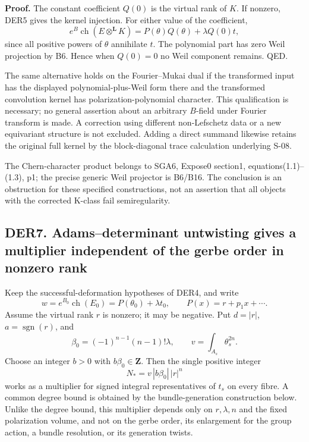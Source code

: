 \documentclass[11pt,a4paper]{article}
\theoremstyle{definition}
\begin{document}
\textbf{Proof.} The constant coefficient \(Q(0)\) is the virtual rank of
\(K\). If nonzero, DER5 gives the kernel injection. For either value of
the coefficient, \[
 e^B\operatorname{ch}(E\otimes^{\mathbf L}K)
 =P(\theta)Q(\theta)+\lambda Q(0)t,
\tag{DER6}
\] since all positive powers of \(\theta\) annihilate \(t\). The
polynomial part has zero Weil projection by B6. Hence when \(Q(0)=0\) no
Weil component remains. QED.

The same alternative holds on the Fourier--Mukai dual if the transformed
input has the displayed polynomial-plus-Weil form there and the
transformed convolution kernel has polarization-polynomial character.
This qualification is necessary; no general assertion about an arbitrary
\(B\)-field under Fourier transform is made. A correction using
different non-Lefschetz data or a new equivariant structure is not
excluded. Adding a direct summand likewise retains the original full
kernel by the block-diagonal trace calculation underlying S-08.

The Chern-character product belongs to SGA6, Expose0 section1,
equations(1.1)--(1.3), p1; the precise generic Weil projector is B6/B16.
The conclusion is an obstruction for these specified constructions, not
an assertion that all objects with the corrected K-class fail
semiregularity.

\subsection{DER7. Adams--determinant untwisting gives a multiplier
independent of the gerbe order in nonzero
rank}\label{derived-functors-der7.-adamsdeterminant-untwisting-gives-a-multiplier-independent-of-the-gerbe-order-in-nonzero-rank}

Keep the successful-deformation hypotheses of DER4, and write \[
 w=e^{B_0}\operatorname{ch}(E_0)=P(\theta_0)+\lambda t_0,
 \qquad P(x)=r+p_1x+\cdots.
\] Assume the virtual rank \(r\) is nonzero; it may be negative. Put
\(d=|r|\), \(a=\operatorname{sgn}(r)\), and \[
 \beta_0=(-1)^{n-1}(n-1)!\lambda,\qquad
 v=\int_{A_s}\theta_s^{2n}.
\] Choose an integer \(b>0\) with \(b\beta_0\in\mathbf Z\). Then the
single positive integer \[
 N_*=v\,|b\beta_0|\,|r|^n
\tag{DER7a}
\] works as a multiplier for signed integral representatives of \(t_s\)
on every fibre. A common degree bound is obtained by the
bundle-generation construction below. Unlike the degree bound, this
multiplier depends only on \(r,\lambda,n\) and the fixed polarization
volume, and not on the gerbe order, its enlargement for the group
action, a bundle resolution, or its generation twists.
\end{document}
